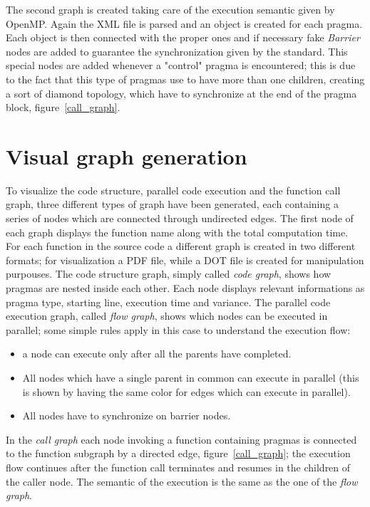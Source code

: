 \documentclass[a4paper,12pt,oneside]{book}
\begin{document}
The second graph is created taking care of the execution semantic given by OpenMP. Again the XML file is parsed and an object is created for each pragma. Each object is then connected with the proper ones and if necessary fake \emph{Barrier} nodes are added to guarantee the synchronization given by the standard. This special nodes are added whenever a "control" pragma is encountered; this is due to the fact that this type of pragmas use to have more than one children, creating a sort of diamond topology, which have to synchronize at the end of the pragma block, figure~\ref{call_graph}.

\section{Visual graph generation}

To visualize the code structure, parallel code execution and the function call graph, three different types of graph have been generated, each containing a series of nodes which are connected through undirected edges. The first node of each graph displays the function name along with the total computation time. For each function in the source code a different graph is created in two different formats; for visualization a PDF file, while a DOT file is created for manipulation purpouses. The code structure graph, simply called \emph{code graph}, shows how pragmas are nested inside each other. Each node displays relevant informations as pragma type, starting line, execution time and variance. The parallel code execution graph, called \emph{flow graph}, shows which nodes can be executed in parallel; some simple rules apply in this case to understand the execution flow:
\begin{itemize}
\item{a node can execute only after all the parents have completed.}
\item{All nodes which have a single parent in common can execute in parallel (this is shown by having the same color for edges which can execute in parallel).}
\item{All nodes have to synchronize on barrier nodes.}
\end{itemize}
In the \emph{call graph} each node invoking a function containing pragmas is connected to the function subgraph by a directed edge, figure~\ref{call_graph}; the execution flow continues after the function call terminates and resumes in the children of the caller node. The semantic of the execution is the same as the one of the \emph{flow graph}.
\end{document}
